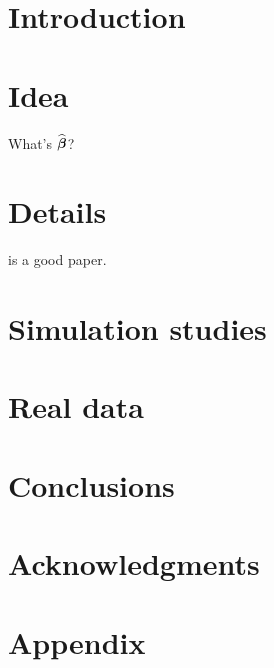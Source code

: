 \section{Introduction}

\section{Idea}

What's $\widehat{\boldsymbol{\beta}}$?

\as{\y = \X\bb + \bvep}

\section{Details}

\citet{Tibshirani1996} is a good paper.

\section{Simulation studies}
\label{Sec:sim}



\section{Real data}

\section{Conclusions}

\section*{Acknowledgments}

\section*{Appendix}
